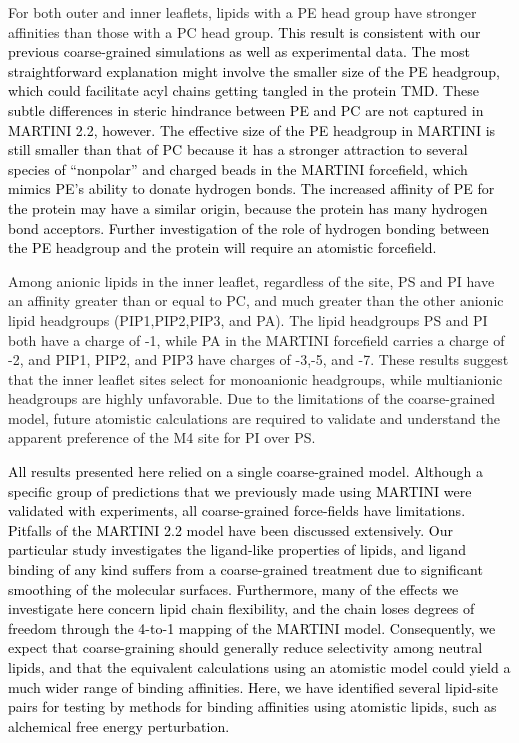 \documentclass[%
 aip,
 amsmath,amssymb,
 preprint,%
]{revtex4-1}\usepackage{setspace}
\newcommand{\grace}[1]{\textcolor{black}{{#1}}}
\begin{document}
For both outer and inner leaflets, lipids with a PE head group have stronger affinities than those with a PC head group. \grace{This result is consistent with our previous coarse-grained simulations\cite{Sharp2019, Tong2019} as well as experimental data\cite{Tong2019}. The most straightforward explanation might involve the smaller size of the PE headgroup, which could facilitate acyl chains getting tangled in the protein TMD. These subtle differences in steric hindrance between PE and PC are not captured in MARTINI 2.2, however.  The effective size of the PE headgroup in MARTINI is still smaller than that of PC because it has a stronger attraction to several species of ``nonpolar'' and charged beads in the MARTINI forcefield, which mimics PE's ability to donate hydrogen bonds. The increased affinity of PE for the protein may have a similar origin, because the protein has many hydrogen bond acceptors. Further investigation of the role of hydrogen bonding between the PE headgroup and the protein will require an atomistic forcefield.}  

Among anionic lipids in the inner leaflet, regardless of the site, PS and PI have an affinity greater than or equal to PC, and much greater than the other anionic lipid headgroups (PIP1,PIP2,PIP3, and PA).   The lipid headgroups PS and PI both have a charge of -1, while PA in the MARTINI forcefield\cite{DeJong2012} carries a charge of -2, and PIP1, PIP2, and PIP3 have charges of -3,-5, and -7. These results suggest that the inner leaflet sites select for monoanionic headgroups, while multianionic headgroups are highly unfavorable.  Due to the limitations of the coarse-grained model, future atomistic calculations are required to validate and understand the apparent preference of the M4 site for PI over PS.  %

\grace{All results presented here relied on a single coarse-grained model.  Although a specific group of predictions that we previously made using MARTINI were validated with experiments\cite{Tong2019}, all coarse-grained force-fields have limitations. Pitfalls of the MARTINI 2.2 model have been discussed extensively. \cite{Alessandri2019} Our particular study investigates the ligand-like properties of lipids, and ligand binding of any kind suffers from a coarse-grained treatment due to significant smoothing of the molecular surfaces. Furthermore, many of the effects we investigate here concern lipid chain flexibility, and the chain loses degrees of freedom through the 4-to-1 mapping of the MARTINI model.  Consequently, we expect that coarse-graining should generally reduce selectivity among neutral lipids, and that the equivalent calculations using an atomistic model could yield a much wider range of binding affinities.  Here, we have identified several lipid-site pairs for testing by methods for binding affinities using atomistic lipids, such as alchemical free energy perturbation.\cite{Salari2019} }
\end{document}
